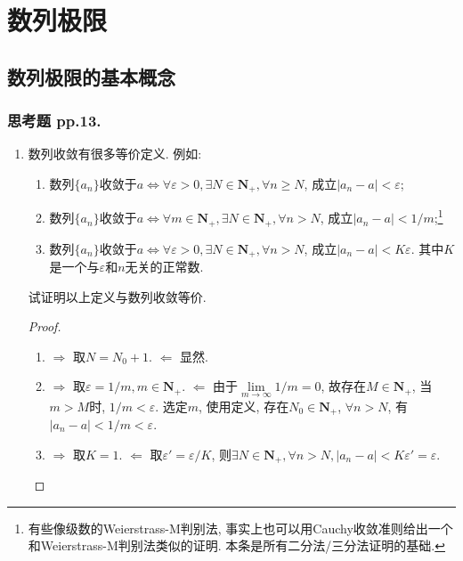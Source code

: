 \documentclass[a4paper,11pt,twoside]{ctexbook}
\begin{document}
\fi

\setcounter{chapter}{1}
\chapter{数列极限}
\section{数列极限的基本概念}
\subsection{思考题 pp.13.}
\kaishu
\begin{enumerate}
	\item 数列收敛有很多等价定义. 例如:
	      \begin{enumerate}[(1)]
		      \item 数列$\{a_n\}$收敛于$a$$\Longleftrightarrow$$\forall\varepsilon>0,\exists N\in\mathbf{N}_{+},\forall n\geqslant N$, 成立$|a_n-a|<\varepsilon$;
		      \item 数列$\{a_n\}$收敛于$a$$\Longleftrightarrow$$\forall m\in\mathbf{N}_{+},\exists N\in\mathbf{N}_{+},\forall n>N$, 成立$|a_n-a|<1/m$;\footnote{有些像级数的Weierstrass-M判别法, 事实上也可以用Cauchy收敛准则给出一个和Weierstrass-M判别法类似的证明. 本条是所有二分法/三分法证明的基础.}
		      \item 数列$\{a_n\}$收敛于$a$$\Longleftrightarrow$$\forall\varepsilon>0,\exists N\in\mathbf{N}_{+},\forall n>N$, 成立$|a_n-a|<K\varepsilon$. 其中$K$是一个与$\varepsilon$和$n$无关的正常数.
	      \end{enumerate}
	      试证明以上定义与数列收敛等价.

	      \begin{proof}
		      \begin{enumerate}[(1)]
			      \item $\Rightarrow$ 取$N=N_0+1$. $\Leftarrow$ 显然.
			      \item $\Rightarrow$ 取$\varepsilon=1/m, m\in\mathbf{N}_{+}$. $\Leftarrow$ 由于$\lim\limits_{m\to\infty} 1/m=0$, 故存在$M\in\mathbf{N}_{+}$, 当$m>M$时, $1/m<\varepsilon$. 选定$m$, 使用定义, 存在$N_0\in\mathbf{N}_{+}$, $\forall n>N$, 有$|a_n-a|<1/m<\varepsilon$.
			      \item $\Rightarrow$ 取$K=1$. $\Leftarrow$ 取$\varepsilon'=\varepsilon/K$, 则$\exists N\in\mathbf{N}_{+}, \forall n>N, |a_n-a|<K\varepsilon'=\varepsilon$.\qedhere
		      \end{enumerate}
	      \end{proof}


\end{enumerate}
\end{document}
